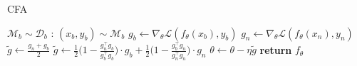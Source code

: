 \documentclass[10pt,twocolumn,letterpaper]{article}
\begin{document}
\setlength{\textfloatsep}{15pt}\begin{algorithm}[t!]
\caption{CFA} \label{alg:cfa}
\footnotesize
\small
\begin{algorithmic}[1]
    \State $\mathcal{M}_b \sim \mathcal{D}_b$
            :
                        \State $(x_{b}, y_{b})\sim\mathcal{M}_b$
                        \State $g_{b}\gets\nabla_{\theta} \mathcal{L}(f_{\theta}(x_{b}), y_{b})$
                        \State $g_{n}\gets\nabla_{\theta} \mathcal{L}(f_{\theta}(x_{n}), y_{n})$
                            \State $\tilde{g}\gets \frac{g_{n} + g_{b}}{2}$
                        \Else
                            \State $\tilde{g}\gets \frac{1}{2} \Big(1 -  \frac{g_{n}^\top g_{b}}{g_{b}^\top g_{b}} \Big) \cdot g_{b} +  \frac{1}{2} \Big( 1 - \frac{g_{b}^\top g_{n}}{g_{n}^\top g_{n}} \Big) \cdot g_{n}$
                        \EndIf
                        \State $\theta \gets \theta - \eta\tilde{g}$
                \EndFor
            \EndFor
    \State \textbf{return} $f_{\theta}$
  \EndProcedure
\end{algorithmic} 
\end{algorithm}
 
\end{document}
